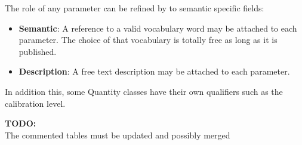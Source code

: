 \documentclass[11pt,a4paper]{ivoa}
\newcommand{\TODO}[1]{%
    \noindent%
    \colorbox{todocolor}{%
            \parbox{0.85\linewidth}{\sffamily \textbf{TODO:}\\
            #1}
    }%
    \vspace{2pt}

}
\begin{document}
The role of any parameter can be refined by to semantic specific fields: 
\begin{itemize}
    \item \textbf{Semantic}: A reference to  a valid vocabulary word may be attached to each parameter. 
          The choice of that vocabulary is totally free as long as it is published.
    \item \textbf{Description}: A free text description may be attached to each parameter.
\end{itemize}

In addition this, some Quantity classes have their own qualifiers such as the calibration level.


\TODO{The commented tables must be updated and possibly merged}

%
\end{document}
